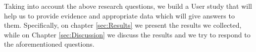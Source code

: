 Taking into account the above research questions, we build a User study that will help us to provide evidence and appropriate data which will give answers to them. Specifically, on chapter \ref{sec:Results} we present the results we collected, while on Chapter \ref{sec:Discussion} we discuss the results and we try to respond to the aforementioned questions.


